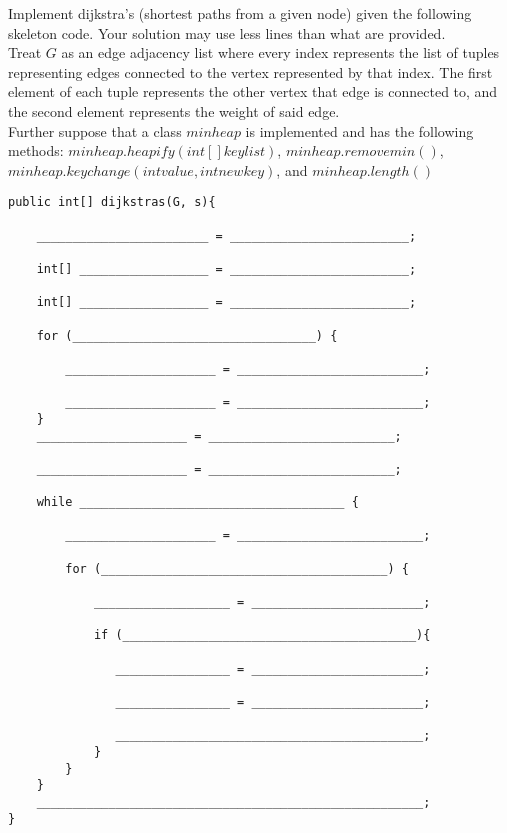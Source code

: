 \question Implement dijkstra's (shortest paths from a given node) given the following skeleton code. Your solution may use less lines than what are provided.\\

Treat $G$ as an edge adjacency list where every index represents the list of tuples representing edges connected to the vertex represented by that index. The first element of each tuple represents the other vertex that edge is connected to, and the second element represents the weight of said edge.\\

Further suppose that a class $minheap$ is implemented and has the following methods: $minheap.heapify(int[] keylist)$, $minheap.removemin()$, $minheap.keychange(int value, int newkey)$, and $minheap.length()$

\begin{lstlisting}
public int[] dijkstras(G, s){

    ________________________ = _________________________;
    
    int[] __________________ = _________________________;
    
    int[] __________________ = _________________________;
    
    for (__________________________________) {
    
        _____________________ = __________________________;

        _____________________ = __________________________;
    }
    _____________________ = __________________________;
    
    _____________________ = __________________________;
    
    while _____________________________________ {
    
        _____________________ = __________________________;
        
        for (________________________________________) {
        
            ___________________ = ________________________;
            
            if (_________________________________________){
            
               ________________ = ________________________;
               
               ________________ = ________________________;
               
               ___________________________________________;
            }
        }
    }
    ______________________________________________________;
}
\end{lstlisting}

